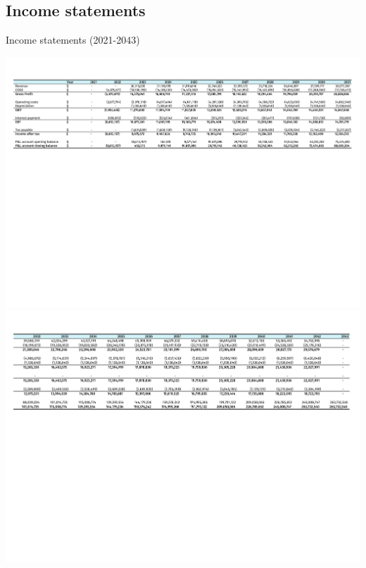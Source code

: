  
 \newpage
 \begin{landscape}
 \subsection{Income statements}
\begin{table}[H]
\label{tab:Income}
  \caption{Income statements (2021-2043)}
\includegraphics[clip, trim=0cm 12cm 0cm 1cm, width=\linewidth]{chapters/Z-support/attachments/Income1.pdf}\\

\includegraphics[clip, trim=0cm 12cm 0cm 1cm, width=\linewidth]{chapters/Z-support/attachments/Income2.pdf}
\end{table}
 \end{landscape}


